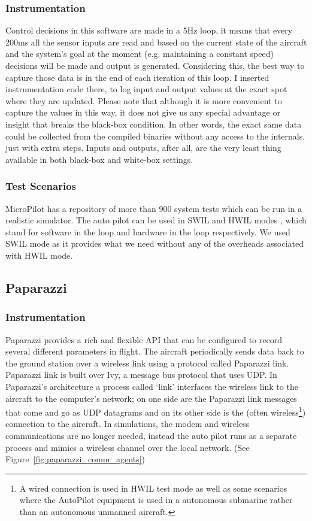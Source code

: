 \subsubsection{Instrumentation}
Control decisions in this software are made in a 5Hz loop, it means that every 200ms all the sensor inputs are read and based on the current state of the aircraft and the system's goal at the moment (e.g. maintaining a constant speed) decisions will be made and output is generated. Considering this, the best way to capture those data is in the end of each iteration of this loop. I inserted instrumentation code there, to log input and output values at the exact spot where they are updated. 
Please note that although it is more convenient to capture the values in this way, it does not give us any special advantage or insight that breaks the black-box condition. In other words, the exact same data could be collected from the compiled binaries without any access to the internals, just with extra steps. Inputs and outputs, after all, are the very least thing available in both black-box and white-box settings.

\subsubsection{Test Scenarios}\label{sec:mp_test_scenarios}
MicroPilot has a repository of more than 900 system tests which can be run in a realistic simulator. The auto pilot can be used in SWIL and HWIL modes \cite{melmoth2019true}, which stand for software in the loop and hardware in the loop respectively. We used SWIL mode as it provides what we need without any of the overheads associated with HWIL mode. 

\subsection{Paparazzi}\label{sec:paparazzi_data_collection}

\subsubsection{Instrumentation}
Paparazzi provides a rich and flexible API that can be configured to record several different parameters in flight. The aircraft periodically sends data back to the ground station over a wireless link using a protocol called Paparazzi link. Paparazzi link is built over Ivy, a message bus protocol that uses UDP. 
In Paparazzi's architecture a process called `link' interfaces the wireless link to the aircraft to the computer's network; on one side are the Paparazzi link messages that come and go as UDP datagrams and on its other side is the (often wireless\footnote{A wired connection is used in HWIL test mode as well as some scenarios where the AutoPilot equipment is used in a autonomous submarine rather than an autonomous unmanned aircraft.}) connection to the aircraft.
In simulations, the modem and wireless communications are no longer needed, instead the auto pilot runs as a separate process and mimics a wireless channel over the local network. (See Figure~\ref{fig:paparazzi_comm_agents})

